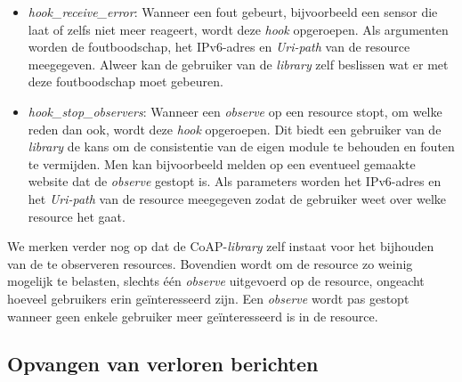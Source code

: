 \begin{itemize}
\begin{itemize}
\item \textit{hook\_receive\_error}: Wanneer een fout gebeurt, bijvoorbeeld een sensor die laat of zelfs niet meer reageert, wordt deze \textit{hook} opgeroepen. Als argumenten worden de foutboodschap, het IPv6-adres en \textit{Uri-path} van de resource meegegeven. Alweer kan de gebruiker van de \textit{library} zelf beslissen wat er met deze foutboodschap moet gebeuren.
\item \textit{hook\_stop\_observers}: Wanneer een \textit{observe} op een resource stopt, om welke reden dan ook, wordt deze \textit{hook} opgeroepen. Dit biedt een gebruiker van de \textit{library} de kans om de consistentie van de eigen module te behouden en fouten te vermijden. Men kan bijvoorbeeld melden op een eventueel gemaakte website dat de \textit{observe} gestopt is. Als parameters worden het IPv6-adres en het \textit{Uri-path} van de resource meegegeven zodat de gebruiker weet over welke resource het gaat.
\end{itemize}
\end{itemize}

We merken verder nog op dat de CoAP-\textit{library} zelf instaat voor het bijhouden van de te observeren resources. Bovendien wordt om de resource zo weinig mogelijk te belasten, slechts \'{e}\'{e}n \textit{observe} uitgevoerd op de resource, ongeacht hoeveel gebruikers erin ge\"{i}nteresseerd zijn. Een \textit{observe} wordt pas gestopt wanneer geen enkele gebruiker meer ge\"{i}nteresseerd is in de resource.


\subsection{Opvangen van verloren berichten} \label{exponentialBackoff}

